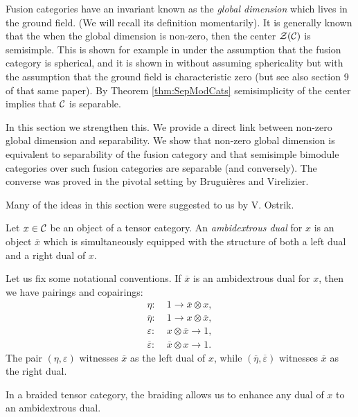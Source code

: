 \documentclass{amsart}
\begin{document}
Fusion categories have an invariant known as the \emph{global dimension} which lives in the ground field. (We will recall its definition momentarily). It is generally known that the when the global dimension is non-zero, then the center $\mathcal Z(\mathcal C)$ is semisimple. This is shown for example in \cite[Prop. 3.10]{MR1966525} under the assumption that the fusion category is spherical, and it is shown in \cite[Thm. 2.15]{MR2183279} without assuming sphericality but with the assumption that the ground field is characteristic zero (but see also section 9 of that same paper). 
By Theorem \ref{thm:SepModCats} semisimplicity of the center implies that $\mathcal C$ is separable. 

In this section we strengthen this. We provide a direct link between non-zero global dimension and separability. We show that non-zero global dimension is equivalent to separability of the fusion category and that  semisimple bimodule categories over such fusion categories are separable (and conversely).  The converse was proved in the pivotal setting \cite{MR3079759} by Brugui\`eres and Virelizier.

Many of the ideas in this section were suggested to us by V. Ostrik. 

\begin{definition}
	Let $x \in \mathcal C$ be an object of a tensor category. An {\em ambidextrous dual} for $x$ is an object $\overline{x}$ which is simultaneously equipped with the structure of both a left dual and a right dual of $x$. 
\end{definition}

Let us fix some notational conventions. If $\overline{x}$ is an ambidextrous dual for $x$, then we have pairings and copairings:
\begin{align*}
	\eta: 					& \; 1 \to \overline{x} \otimes x, \\
	\overline{\eta}: 		& \;  1 \to   x \otimes \overline{x}, \\
	\varepsilon: 			& \;  x \otimes \overline{x} \to 1, \\
	\overline{\varepsilon}: & \;   \overline{x} \otimes x  \to 1. 
\end{align*} 
The pair $(\eta, \varepsilon)$ witnesses $\overline{x}$ as the left dual of $x$, while $(\overline{\eta}, \overline{\varepsilon})$ witnesses $\overline{x}$ as the right dual.  

\begin{example}
	In a braided tensor category, the braiding allows us to enhance any dual of $x$ to an ambidextrous dual. 
\end{example}
\end{document}
